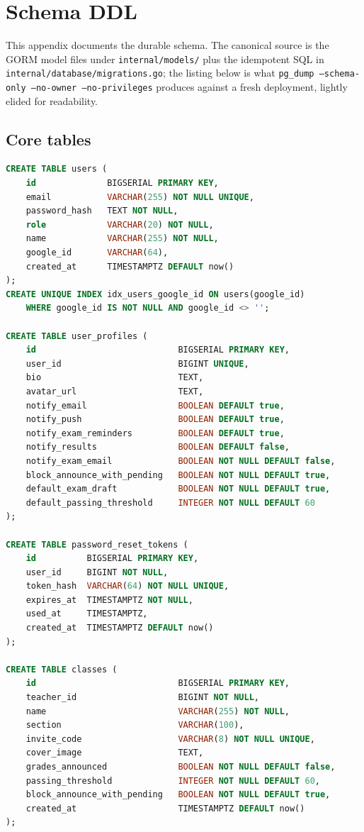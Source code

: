 \chapter{Schema DDL}
\label{appendix:schema-ddl}

This appendix documents the durable schema. The canonical source is the GORM model files under \texttt{internal/models/} plus the idempotent SQL in \texttt{internal/database/migrations.go}; the listing below is what \texttt{pg\_dump --schema-only --no-owner --no-privileges} produces against a fresh deployment, lightly elided for readability.

\section{Core tables}

\begin{lstlisting}[language=SQL,basicstyle=\ttfamily\footnotesize,breaklines=true]
CREATE TABLE users (
    id              BIGSERIAL PRIMARY KEY,
    email           VARCHAR(255) NOT NULL UNIQUE,
    password_hash   TEXT NOT NULL,
    role            VARCHAR(20) NOT NULL,
    name            VARCHAR(255) NOT NULL,
    google_id       VARCHAR(64),
    created_at      TIMESTAMPTZ DEFAULT now()
);
CREATE UNIQUE INDEX idx_users_google_id ON users(google_id)
    WHERE google_id IS NOT NULL AND google_id <> '';

CREATE TABLE user_profiles (
    id                            BIGSERIAL PRIMARY KEY,
    user_id                       BIGINT UNIQUE,
    bio                           TEXT,
    avatar_url                    TEXT,
    notify_email                  BOOLEAN DEFAULT true,
    notify_push                   BOOLEAN DEFAULT true,
    notify_exam_reminders         BOOLEAN DEFAULT true,
    notify_results                BOOLEAN DEFAULT false,
    notify_exam_email             BOOLEAN NOT NULL DEFAULT false,
    block_announce_with_pending   BOOLEAN NOT NULL DEFAULT true,
    default_exam_draft            BOOLEAN NOT NULL DEFAULT true,
    default_passing_threshold     INTEGER NOT NULL DEFAULT 60
);

CREATE TABLE password_reset_tokens (
    id          BIGSERIAL PRIMARY KEY,
    user_id     BIGINT NOT NULL,
    token_hash  VARCHAR(64) NOT NULL UNIQUE,
    expires_at  TIMESTAMPTZ NOT NULL,
    used_at     TIMESTAMPTZ,
    created_at  TIMESTAMPTZ DEFAULT now()
);

CREATE TABLE classes (
    id                            BIGSERIAL PRIMARY KEY,
    teacher_id                    BIGINT NOT NULL,
    name                          VARCHAR(255) NOT NULL,
    section                       VARCHAR(100),
    invite_code                   VARCHAR(8) NOT NULL UNIQUE,
    cover_image                   TEXT,
    grades_announced              BOOLEAN NOT NULL DEFAULT false,
    passing_threshold             INTEGER NOT NULL DEFAULT 60,
    block_announce_with_pending   BOOLEAN NOT NULL DEFAULT true,
    created_at                    TIMESTAMPTZ DEFAULT now()
);


\end{lstlisting}
